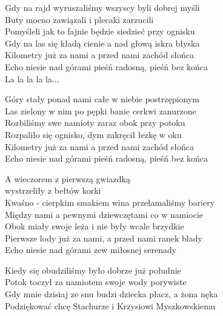 \begin{text}
    \small{
Gdy na rajd wyruszaliśmy wszyscy byli dobrej myśli\\
Buty mocno zawiązali i plecaki zarzucili\\
Pomyśleli jak to fajnie będzie siedzieć przy ognisku\\
Gdy na las się kładą cienie a nad głową iskra błyska\\
Kilometry już za nami a przed nami zachód słońca\\
Echo niesie nad górami pieśń radosną, pieśń bez końca\\
La la la la la...

Góry stały ponad nami całe w niebie postrzępionym\\
Las zielony w nim po pępki banie cerkwi zanurzone\\
Rozbiliśmy swe namioty zaraz obok przy potoku\\
Rozpaliło się ognisko, dym zakręcił łezkę w oku\\
Kilometry już za nami a przed nami zachód słońca\\
Echo niesie nad górami pieśń radosną, pieśń bez końca

A wieczorem z pierwszą gwiazdką\\
    \vin \vin \vin \vin wystrzeliły z bełtów korki\\
Kwaśno - cierpkim smakiem wina przełamaliśmy bariery\\
Między nami a pewnymi dziewczętami co w namiocie\\
Obok miały swoje leża i nie były wcale brzydkie\\
Pierwsze lody już za nami, a przed nami ranek blady\\
Echo niesie nad górami zew miłosnej serenady

Kiedy się obudziliśmy było dobrze już południe\\
Potok toczył za namiotem swoje wody porywiste\\
Gdy mnie dzisiaj ze snu budzi dziecka płacz, a żona nęka\\
Podziękować chcę Stachurze i Krzysiowi Myszkowskiemu
    }
\end{text}
